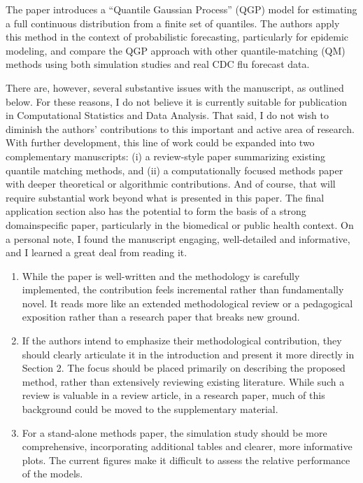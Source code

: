 \documentclass{article}
\begin{document}
The paper introduces a “Quantile Gaussian Process” (QGP) model for estimating a 
full continuous distribution from a finite set of quantiles. The authors
apply this method in the context of probabilistic forecasting, particularly for
epidemic modeling, and compare the QGP approach with other quantile-matching
(QM) methods using both simulation studies and real CDC flu forecast data.

There are, however, several substantive issues with the manuscript, as outlined 
below. For these reasons, I do not believe it is currently suitable for
publication in Computational Statistics and Data Analysis. That said, I do not
wish to diminish the authors’ contributions to this important and active area
of research. With further development, this line of work could be expanded
into two complementary manuscripts: (i) a review-style paper summarizing 
existing quantile matching methods, and (ii) a computationally focused methods
paper with deeper theoretical or algorithmic contributions. And of course, that
will require substantial work beyond what is presented in this paper. The final
application section also has the potential to form the basis of a strong 
domainspecific paper, particularly in the biomedical or public health context. 
On a
personal note, I found the manuscript engaging, well-detailed and informative,
and I learned a great deal from reading it.

\begin{enumerate}[1]

  \item While the paper is well-written and the methodology is carefully 
  implemented, the contribution feels incremental rather than fundamentally
  novel. It reads more like an extended methodological review or a pedagogical 
  exposition rather than a research paper that breaks new ground.
  
  \item If the authors intend to emphasize their methodological contribution, 
  they
  should clearly articulate it in the introduction and present it more directly
  in Section 2. The focus should be placed primarily on describing the
  proposed method, rather than extensively reviewing existing literature.
  While such a review is valuable in a review article, in a research paper,
  much of this background could be moved to the supplementary material.
  
  \item For a stand-alone methods paper, the simulation study should be more
  comprehensive, incorporating additional tables and clearer, more informative 
  plots. The current figures make it difficult to assess the relative
  performance of the models.
  
\end{enumerate}  


  
\end{document}
